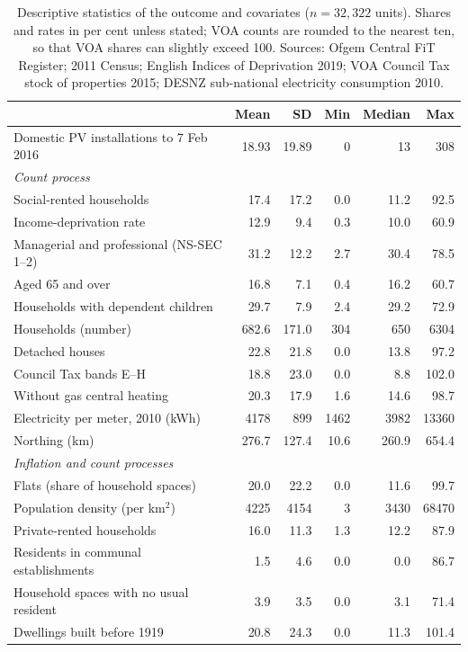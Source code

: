 \begin{table}[htbp]
\centering
\caption{Descriptive statistics of the outcome and covariates ($n = 32{,}322$ units). Shares and rates in per cent unless stated; VOA counts are rounded to the nearest ten, so that VOA shares can slightly exceed 100. Sources: Ofgem Central FiT Register; 2011 Census; English Indices of Deprivation 2019; VOA Council Tax stock of properties 2015; DESNZ sub-national electricity consumption 2010.}\label{tab:solar_desc}
\small
\begin{tabular}{lrrrrr}
\toprule
 & Mean & SD & Min & Median & Max \\
\midrule
Domestic PV installations to 7 Feb 2016 & 18.93 & 19.89 & 0 & 13 & 308 \\
\midrule
\multicolumn{6}{l}{\textit{Count process}} \\
\quad Social-rented households & 17.4 & 17.2 & 0.0 & 11.2 & 92.5 \\
\quad Income-deprivation rate & 12.9 & 9.4 & 0.3 & 10.0 & 60.9 \\
\quad Managerial and professional (NS-SEC 1--2) & 31.2 & 12.2 & 2.7 & 30.4 & 78.5 \\
\quad Aged 65 and over & 16.8 & 7.1 & 0.4 & 16.2 & 60.7 \\
\quad Households with dependent children & 29.7 & 7.9 & 2.4 & 29.2 & 72.9 \\
\quad Households (number) & 682.6 & 171.0 & 304 & 650 & 6304 \\
\quad Detached houses & 22.8 & 21.8 & 0.0 & 13.8 & 97.2 \\
\quad Council Tax bands E--H & 18.8 & 23.0 & 0.0 & 8.8 & 102.0 \\
\quad Without gas central heating & 20.3 & 17.9 & 1.6 & 14.6 & 98.7 \\
\quad Electricity per meter, 2010 (kWh) & 4178 & 899 & 1462 & 3982 & 13360 \\
\quad Northing (km) & 276.7 & 127.4 & 10.6 & 260.9 & 654.4 \\
\midrule
\multicolumn{6}{l}{\textit{Inflation and count processes}} \\
\quad Flats (share of household spaces) & 20.0 & 22.2 & 0.0 & 11.6 & 99.7 \\
\quad Population density (per km$^2$) & 4225 & 4154 & 3 & 3430 & 68470 \\
\quad Private-rented households & 16.0 & 11.3 & 1.3 & 12.2 & 87.9 \\
\quad Residents in communal establishments & 1.5 & 4.6 & 0.0 & 0.0 & 86.7 \\
\quad Household spaces with no usual resident & 3.9 & 3.5 & 0.0 & 3.1 & 71.4 \\
\quad Dwellings built before 1919 & 20.8 & 24.3 & 0.0 & 11.3 & 101.4 \\
\bottomrule
\end{tabular}
\end{table}

